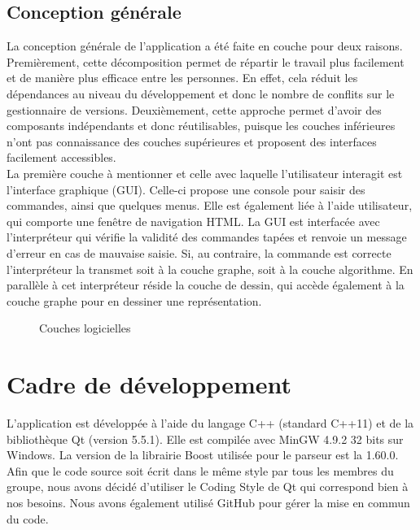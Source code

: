 \documentclass[french]{article}
\begin{document}
		\subsection{Conception générale}
		La conception générale de l'application a été faite en couche pour deux raisons. Premièrement, cette décomposition permet de répartir le travail plus facilement et de manière plus efficace entre les personnes. En effet, cela réduit les dépendances au niveau du développement et donc le nombre de conflits sur le gestionnaire de versions. Deuxièmement, cette approche permet d'avoir des composants indépendants et donc réutilisables, puisque les couches inférieures n'ont pas connaissance des couches supérieures et proposent des interfaces facilement accessibles.\\
		La première couche à mentionner et celle avec laquelle l'utilisateur interagit est l'interface graphique (GUI). Celle-ci propose une console pour saisir des commandes, ainsi que quelques menus. Elle est également liée à l'aide utilisateur, qui comporte une fenêtre de navigation HTML. La GUI est interfacée avec l'interpréteur qui vérifie la validité des commandes tapées et renvoie un message d'erreur en cas de mauvaise saisie. Si, au contraire, la commande est correcte l'interpréteur la transmet soit à la couche graphe, soit à la couche algorithme. En parallèle à cet interpréteur réside la couche de dessin, qui accède également à la couche graphe pour en dessiner une représentation.
		
		\begin{figure}[H]
			\centering
			\caption{Couches logicielles}
		\end{figure}
	
	\section{Cadre de développement} 
		L'application est développée à l'aide du langage C++ (standard C++11) et de la bibliothèque Qt (version 5.5.1). Elle est compilée avec MinGW 4.9.2 32 bits sur Windows. La version de la librairie Boost utilisée pour le parseur est la 1.60.0. Afin que le code source soit écrit dans le même style par tous les membres du groupe, nous avons décidé d'utiliser le Coding Style de Qt \cite{qtStyle} qui correspond bien à nos besoins. Nous avons également utilisé GitHub pour gérer la mise en commun du code.
			
\end{document}
